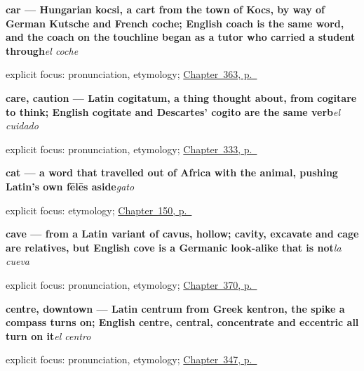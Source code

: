 \noindent\begin{minipage}[t]{\linewidth}
\raggedright
\textbf{car — Hungarian kocsi, a cart from the town of Kocs, by way of German Kutsche and French coche; English coach is the same word, and the coach on the touchline began as a tutor who carried a student through}\enspace\emph{el coche}\par
\footnotesize explicit focus: pronunciation, etymology; \hyperref[ch:el-coche-y-el-avion]{Chapter~363, p.~\pageref*{ch:el-coche-y-el-avion}}
\end{minipage}\par\smallskip

\noindent\begin{minipage}[t]{\linewidth}
\raggedright
\textbf{care, caution — Latin cogitatum, a thing thought about, from cogitare to think; English cogitate and Descartes' cogito are the same verb}\enspace\emph{el cuidado}\par
\footnotesize explicit focus: pronunciation, etymology; \hyperref[ch:calma-y-prisa]{Chapter~333, p.~\pageref*{ch:calma-y-prisa}}
\end{minipage}\par\smallskip

\noindent\begin{minipage}[t]{\linewidth}
\raggedright
\textbf{cat — a word that travelled out of Africa with the animal, pushing Latin's own fēlēs aside}\enspace\emph{gato}\par
\footnotesize explicit focus: etymology; \hyperref[ch:spanish-dog-and-cat]{Chapter~150, p.~\pageref*{ch:spanish-dog-and-cat}}
\end{minipage}\par\smallskip

\noindent\begin{minipage}[t]{\linewidth}
\raggedright
\textbf{cave — from a Latin variant of cavus, hollow; cavity, excavate and cage are relatives, but English cove is a Germanic look-alike that is not}\enspace\emph{la cueva}\par
\footnotesize explicit focus: pronunciation, etymology; \hyperref[ch:la-tormenta-y-el-trueno]{Chapter~370, p.~\pageref*{ch:la-tormenta-y-el-trueno}}
\end{minipage}\par\smallskip

\noindent\begin{minipage}[t]{\linewidth}
\raggedright
\textbf{centre, downtown — Latin centrum from Greek kentron, the spike a compass turns on; English centre, central, concentrate and eccentric all turn on it}\enspace\emph{el centro}\par
\footnotesize explicit focus: pronunciation, etymology; \hyperref[ch:el-norte-y-el-sur]{Chapter~347, p.~\pageref*{ch:el-norte-y-el-sur}}
\end{minipage}\par\smallskip

